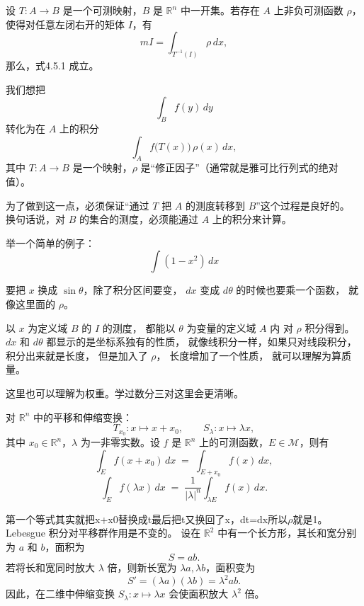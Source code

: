 \documentclass[lang=cn,10pt]{elegantbook}
\begin{document}
\begin{theorem}\label{thm:4.5.2}
设 $T: A \to B$ 是一个可测映射，$B$ 是 $\mathbb{R}^n$ 中一开集。若存在 $A$ 上非负可测函数 $\rho$，使得对任意左闭右开的矩体 $I$，有
\[
mI = \int_{T^{-1}(I)} \rho\, dx,
\tag{4.5.3}
\]
那么，式{4.5.1} 成立。
\end{theorem}
我们想把
\[
\int_B f(y)\,dy
\]
转化为在 $A$ 上的积分
\[
\int_A f\bigl(T(x)\bigr)\,\rho(x)\,dx ,
\]
其中 $T: A \to B$ 是一个映射，$\rho$ 是“修正因子”（通常就是雅可比行列式的绝对值）。

为了做到这一点，必须保证“通过 $T$ 把 $A$ 的测度转移到 $B$”这个过程是良好的。
换句话说，对 $B$ 的集合的测度，必须能通过 $A$ 上的积分来计算。

举一个简单的例子：
\[
\int (1 - x^2)\, dx
\]

要把 $x$ 换成 $\sin\theta$，除了积分区间要变，
$dx$ 变成 $d\theta$ 的时候也要乘一个函数，
就像这里面的 $\rho$。
\begin{dxtips}
    

以 $x$ 为定义域 $B$ 的 $I$ 的测度，
都能以 $\theta$ 为变量的定义域 $A$ 内
对 $\rho$ 积分得到。
$dx$ 和 $d\theta$ 都显示的是坐标系独有的性质，
就像线积分一样，如果只对线段积分，
积分出来就是长度，
但是加入了 $\rho$，
长度增加了一个性质，
就可以理解为算质量。

这里也可以理解为权重。学过数分三对这里会更清晰。
\end{dxtips}
\begin{corollary}\label{cor:4.5.1}
对 $\mathbb{R}^n$ 中的平移和伸缩变换：
\[
T_{x_0}: x \mapsto x + x_0, 
\qquad
S_{\lambda}: x \mapsto \lambda x,
\]
其中 $x_0 \in \mathbb{R}^n$，$\lambda$ 为一非零实数。设 $f$ 是 $\mathbb{R}^n$ 上的可测函数，$E \in \mathcal{M}$，则有
\[
\int_E f(x+x_0)\,dx \;=\; \int_{E+x_0} f(x)\,dx,
\]
\[
\int_E f(\lambda x)\,dx \;=\; \frac{1}{|\lambda|^n} \int_{\lambda E} f(x)\,dx.
\]
\end{corollary}
第一个等式其实就把x+x0替换成t最后把t又换回了x，dt=dx所以$\rho$就是1。
Lebesgue 积分对平移群作用是不变的。
设在 $\mathbb{R}^2$ 中有一个长方形，其长和宽分别为 $a$ 和 $b$，面积为
\[
S = ab.
\]
若将长和宽同时放大 $\lambda$ 倍，则新长宽为 $\lambda a, \lambda b$，面积变为
\[
S' = (\lambda a)(\lambda b) = \lambda^2 ab.
\]
因此，在二维中伸缩变换 $S_\lambda: x \mapsto \lambda x$ 会使面积放大 $\lambda^2$ 倍。
\end{document}
